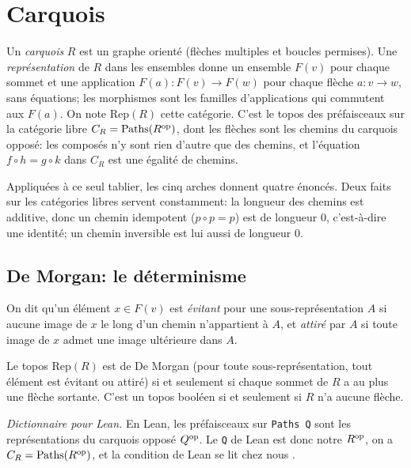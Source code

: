 \section{Carquois}\label{sec:machines}

Un \emph{carquois} $R$ est un graphe orienté (flèches multiples et boucles permises). Une \emph{représentation} de $R$ dans les ensembles donne un ensemble $F(v)$ pour chaque sommet et une application $F(a) : F(v)\to F(w)$ pour chaque flèche $a : v\to w$, sans équations; les morphismes sont les familles d'applications qui commutent aux $F(a)$. On note $\mathrm{Rep}(R)$ cette catégorie. C'est le topos des préfaisceaux sur la catégorie libre $C_R = \mathrm{Paths}(R^{\mathrm{op}})$, dont les flèches sont les chemins du carquois opposé: les composés n'y sont rien d'autre que des chemins, et l'équation $f\circ h = g\circ k$ dans $C_R$ est une égalité de chemins.

Appliquées à ce seul tablier, les cinq arches donnent quatre énoncés. Deux faits sur les catégories libres servent constamment: la longueur des chemins est additive, donc un chemin idempotent ($p\circ p = p$) est de longueur $0$, c'est-à-dire une identité; un chemin inversible est lui aussi de longueur $0$.

\subsection{De Morgan: le déterminisme}

On dit qu'un élément $x\in F(v)$ est \emph{évitant} pour une sous-représentation $A$ si aucune image de $x$ le long d'un chemin n'appartient à $A$, et \emph{attiré} par $A$ si toute image de $x$ admet une image ultérieure dans $A$.

\begin{theorem}\label{th:quivers}
Le topos $\mathrm{Rep}(R)$ est de De Morgan (pour toute sous-représentation, tout élément est évitant ou attiré) si et seulement si chaque sommet de $R$ a au plus une flèche sortante. C'est un topos booléen si et seulement si $R$ n'a aucune flèche.
\end{theorem}

\emph{Dictionnaire pour Lean.} En Lean, les préfaisceaux sur \texttt{Paths Q} sont les représentations du carquois opposé $Q^{\mathrm{op}}$. Le \texttt{Q} de Lean est donc notre $R^{\mathrm{op}}$, on a $C_R = \mathrm{Paths}(R^{\mathrm{op}})$, et la condition  de Lean se lit chez nous .

